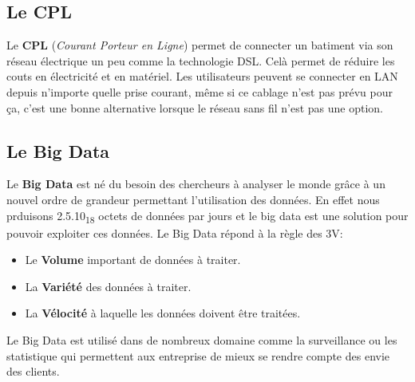 \documentclass[10pt,a4paper]{article}
\begin{document}
 \subsection{Le CPL}
 Le \textbf{CPL} (\textit{Courant Porteur en Ligne}) permet de connecter un batiment via son réseau électrique un peu comme la technologie DSL\@. Celà permet de réduire les couts en électricité et en matériel. Les utilisateurs peuvent se connecter en LAN depuis n'importe quelle prise courant, même si ce cablage n'est pas prévu pour ça, c'est une bonne alternative lorsque le réseau sans fil n'est pas une option.

 \subsection{Le Big Data}
 Le \textbf{Big Data} est né du besoin des chercheurs à analyser le monde grâce à un nouvel ordre de grandeur permettant l'utilisation des données. En effet nous prduisons 2.5.10\textsubscript{18} octets de données par jours et le big data est une solution pour pouvoir exploiter ces données. Le Big Data répond à la règle des 3V\@:
 \begin{itemize}
	 \item Le \textbf{Volume} important de données à traiter.
	 \item La \textbf{Variété} des données à traiter.
	 \item La \textbf{Vélocité} à laquelle les données doivent être traitées.
 \end{itemize}
 Le Big Data est utilisé dans de nombreux domaine comme la surveillance ou les statistique qui permettent aux entreprise de mieux se rendre compte des envie des clients.

 
\end{document}
